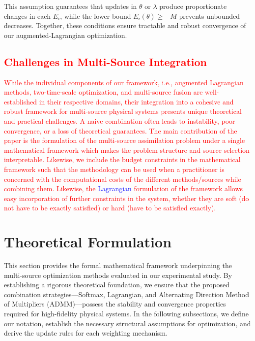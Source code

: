 \documentclass[preprint,12pt,authoryear]{elsarticle}
\begin{document}
\noindent
This assumption guarantees that updates in $\theta$ or $\lambda$ produce proportionate changes in each $E_i$, while the lower bound $E_i(\theta)\ge -M$ prevents unbounded decreases. Together, these conditions ensure tractable and robust convergence of our augmented-Lagrangian optimization.

\subsection{\textcolor{red}{Challenges in Multi-Source Integration}}
\label{subsection:challenges}

\textcolor{red}{While the individual components of our framework, i.e., augmented Lagrangian methods, two-time-scale optimization, and multi-source fusion are well-established in their respective domains, their integration into a cohesive and robust framework for multi-source physical systems presents unique theoretical and practical challenges. A naive combination often leads to instability, poor convergence, or a loss of theoretical guarantees. The main contribution of the paper is the formulation of the multi-source assimilation problem under a single mathematical framework which makes the problem structure and source selection interpretable. Likewise, we include the budget constraints in the mathematical framework such that the methodology can be used when a practitioner is concerned with the computational costs of the different methods/sources while combining them. Likewise, the \textcolor{blue}{Lagrangian} formulation of the framework allows easy incorporation of further constraints in the system, whether they are soft (do not have to be exactly satisfied) or hard (have to be satisfied exactly).}


\section{Theoretical Formulation}
\label{section:theoretical_framework}

This section provides the formal mathematical framework underpinning the multi-source optimization methods evaluated in our experimental study. By establishing a rigorous theoretical foundation, we ensure that the proposed combination strategies—Softmax, Lagrangian, and Alternating Direction Method of Multipliers (ADMM)—possess the stability and convergence properties required for high-fidelity physical systems. In the following subsections, we define our notation, establish the necessary structural assumptions for optimization, and derive the update rules for each weighting mechanism. 
\end{document}
